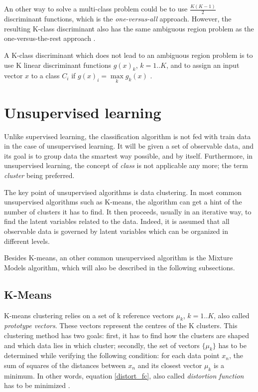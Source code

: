 \noindent An other way to solve a multi-class problem could be to use $\frac{K(K-1)}{2}$ discriminant functions, which is the \textit{one-versus-all} approach. However, the resulting K-class discriminant also has the same ambiguous region problem as the one-versus-the-rest approach \cite{BIS06}.
\newline

\noindent A K-class discriminant which does not lead to an ambiguous region problem is to use K linear discriminant functions $g(x)_k$, $k=1..K$, and to assign an input vector $x$ to a class $C_i$ if $g(x)_i = \max\limits_{k} g_k(x)$ \cite{BIS06}.
\newline


\section{Unsupervised learning}
\label{unsup_learning}

\vspace{\baselineskip}
\noindent Unlike supervised learning, the classification algorithm is not fed with train data in the case of unsupervised learning. It will be given a set of observable data, and its goal is to group data the smartest way possible, and by itself. Furthermore, in unsupervised learning, the concept of \textit{class} is not applicable any more; the term \textit{cluster} being preferred.
\newline

\noindent The key point of unsupervised algorithms is data clustering. In most common unsupervised algorithms such as K-means, the algorithm can get a hint of the number of clusters it has to find. It then proceeds, usually in an iterative way, to find the latent variables related to the data. Indeed, it is assumed that all observable data is governed by latent variables which can be organized in different levels.
\newline

\noindent Besides K-means, an other common unsupervised algorithm is the Mixture Models algorithm, which will also be described in the following subsections.
\newline

\subsection{K-Means}

\vspace{\baselineskip}
\noindent K-means clustering relies on a set of k reference vectors $\mu_k$, $k=1..K$, also called \textit{prototype vectors}. These vectors represent the centres of the K clusters. This clustering method has two goals: first, it has to find how the clusters are shaped and which data lies in which cluster; secondly, the set of vectors $\{\mu_k\}$ has to be determined while verifying the following condition: for each data point $x_n$, the sum of squares of the distances between $x_n$ and its closest vector $\mu_k$ is a minimum. In other words, equation \ref{distort_fc}, also called \textit{distortion function} has to be minimized \cite{BIS06}.

